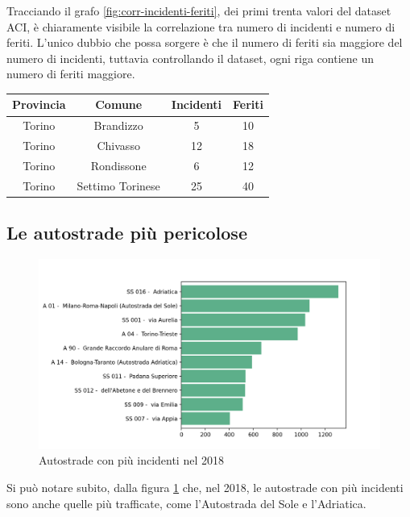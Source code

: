 \documentclass[a4paper]{report}
\begin{document}
Tracciando il grafo \ref{fig:corr-incidenti-feriti}, dei primi trenta valori del dataset ACI, 
è chiaramente visibile la correlazione tra numero di incidenti e numero di feriti.
L'unico dubbio che possa sorgere è che il numero di feriti sia maggiore del numero di incidenti, 
tuttavia controllando il dataset, ogni riga contiene un numero di feriti maggiore. 

\begin{center}
    \def\arraystretch{1.5}%
    \begin{tabular}{ |c|c|c|c| } 
    \hline
    Provincia & Comune & Incidenti & Feriti \\ 
    \hline
    \rowcolor{TableGray}
    Torino & Brandizzo & 5 & 10\\
    Torino & Chivasso & 12 & 18\\
    \rowcolor{TableGray}
    Torino & Rondissone & 6 & 12\\
    Torino & Settimo Torinese & 25 & 40\\
    \hline
    \end{tabular}
\end{center}

\subsection{Le autostrade più pericolose}
\begin{figure}
    \includegraphics[width=\linewidth]{../src/incidenti/incidenti_aci/autostrade/autostrade.png}
    \caption{Autostrade con più incidenti nel 2018}
    \label{fig:incidenti-autostrade}
\end{figure}

Si può notare subito, dalla figura \ref{fig:incidenti-autostrade} che, nel 2018, le 
autostrade con più incidenti sono anche quelle più trafficate, come 
l'Autostrada del Sole e l'Adriatica.
\end{document}
